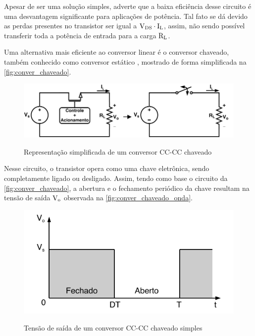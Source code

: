             Apesar de ser uma solução simples,  adverte que a baixa eficiência desse circuito é uma desvantagem significante para aplicações de potência. Tal fato se dá devido as perdas presentes no transistor ser igual a $\text{V}_\text{DS} \cdot \text{I}_\text{L}$, assim, não sendo possível transferir toda a potência de entrada para a carga $\text{R}_\text{L}$. 
            
            Uma alternativa mais eficiente ao conversor linear é o conversor chaveado, também conhecido como conversor estático \cite{ref:ELP_livro_Hart}, mostrado de forma simplificada na \autoref{fig:conver_chaveado}. 
            
            \begin{figure}[H]
            	\centering
            	\caption{Representação simplificada de um conversor CC-CC chaveado}
            	\includegraphics[scale=1]{pdf/outros/conver_chaveado.pdf}
            	\label{fig:conver_chaveado}
            \end{figure}
            
            Nesse circuito, o transistor opera como uma chave eletrônica, sendo completamente ligado ou desligado. Assim, tendo como base o circuito da \autoref{fig:conver_chaveado}, a abertura e o fechamento periódico da chave resultam na tensão de saída $\text{V}_\text{o}$ observada na \autoref{fig:conver_chaveado_onda}.
            
            \begin{figure}[H]
            	\centering
            	\caption{Tensão de saída de um conversor CC-CC chaveado simples}
            	\includegraphics[scale=1]{pdf/outros/tensao_conver_chaveado.pdf}
            	\label{fig:conver_chaveado_onda}
            \end{figure}
            

